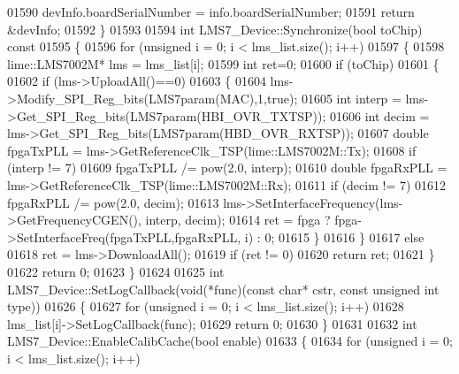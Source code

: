 \begin{DoxyCode}
{{{01590     devInfo.boardSerialNumber = info.boardSerialNumber;
01591     \textcolor{keywordflow}{return} &devInfo;
01592 \}
01593 
01594 \textcolor{keywordtype}{int} LMS7_Device::Synchronize(\textcolor{keywordtype}{bool} toChip)\textcolor{keyword}{ const}
01595 \textcolor{keyword}{}\{
01596     \textcolor{keywordflow}{for} (\textcolor{keywordtype}{unsigned} i = 0; i < lms_list.size(); i++)
01597     \{
01598         lime::LMS7002M* lms = lms_list[i];
01599         \textcolor{keywordtype}{int} ret=0;
01600         \textcolor{keywordflow}{if} (toChip)
01601         \{
01602             \textcolor{keywordflow}{if} (lms->UploadAll()==0)
01603             \{
01604                 lms->Modify_SPI_Reg_bits(LMS7param(MAC),1,\textcolor{keyword}{true});
01605                 \textcolor{keywordtype}{int} interp = lms->Get_SPI_Reg_bits(LMS7param(HBI_OVR_TXTSP));
01606                 \textcolor{keywordtype}{int} decim = lms->Get_SPI_Reg_bits(LMS7param(HBD_OVR_RXTSP));
01607                 \textcolor{keywordtype}{double} fpgaTxPLL = lms->GetReferenceClk_TSP(lime::LMS7002M::Tx);
01608                 \textcolor{keywordflow}{if} (interp != 7)
01609                     fpgaTxPLL /= pow(2.0, interp);
01610                 \textcolor{keywordtype}{double} fpgaRxPLL = lms->GetReferenceClk_TSP(lime::LMS7002M::Rx);
01611                 \textcolor{keywordflow}{if} (decim != 7)
01612                     fpgaRxPLL /= pow(2.0, decim);
01613                 lms->SetInterfaceFrequency(lms->GetFrequencyCGEN(), interp, decim);
01614                 ret = fpga ? fpga->SetInterfaceFreq(fpgaTxPLL,fpgaRxPLL, i) : 0;
01615             \}
01616         \}
01617         \textcolor{keywordflow}{else}
01618             ret = lms->DownloadAll();
01619         \textcolor{keywordflow}{if} (ret != 0)
01620             \textcolor{keywordflow}{return} ret;
01621     \}
01622     \textcolor{keywordflow}{return} 0;
01623 \}
01624 
01625 \textcolor{keywordtype}{int} LMS7_Device::SetLogCallback(\textcolor{keywordtype}{void}(*func)(\textcolor{keyword}{const} \textcolor{keywordtype}{char}* cstr, \textcolor{keyword}{const} \textcolor{keywordtype}{unsigned} \textcolor{keywordtype}{int} 
      type))
01626 \{
01627     \textcolor{keywordflow}{for} (\textcolor{keywordtype}{unsigned} i = 0; i < lms_list.size(); i++)
01628         lms_list[i]->SetLogCallback(func);
01629     \textcolor{keywordflow}{return} 0;
01630 \}
01631 
01632 \textcolor{keywordtype}{int} LMS7_Device::EnableCalibCache(\textcolor{keywordtype}{bool} enable)
01633 \{
01634     \textcolor{keywordflow}{for} (\textcolor{keywordtype}{unsigned} i = 0; i < lms_list.size(); i++)
}}}
\end{DoxyCode}
